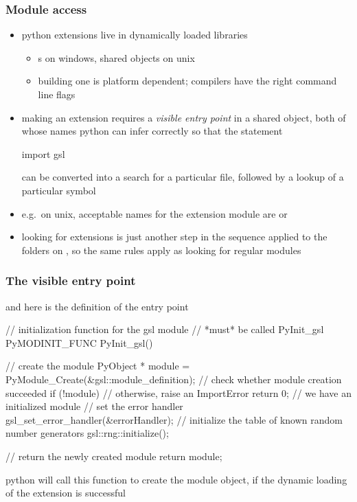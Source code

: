 \begin{frame}[fragile]
%
  \frametitle{Module access}
%
  \begin{itemize}
  \item python extensions live in dynamically loaded libraries
  \begin{itemize}
  \item {}s on windows, shared objects on unix
  \item building one is platform dependent; compilers have the right command line flags
  \end{itemize}
%
  \item making an extension requires a \emph{visible entry point} in a shared object, both of whose
    names python can infer correctly so that the statement
    \begin{ipython}{}
    import gsl
    \end{ipython}
    can be converted into a search for a particular file, followed by a lookup of a particular
    symbol
%
  \item e.g.~on unix, acceptable names for the  extension module are
     or 
%
  \item looking for extensions is just another step in the sequence applied to the folders on
    , so the same rules apply as looking for regular modules
%
  \end{itemize}
%
\end{frame}

\begin{frame}[fragile]
%
  \frametitle{The visible entry point}
%
  and here is the definition of the entry point
%
  \begin{iC++}{}
// initialization function for the gsl module
// *must* be called PyInit_gsl
PyMODINIT_FUNC PyInit_gsl()
{
    // create the module
    PyObject * module = PyModule_Create(&gsl::module_definition);
    // check whether module creation succeeded
    if (!module) { 
        // otherwise, raise an ImportError
        return 0; 
    }
    // we have an initialized module
    // set the error handler
    gsl_set_error_handler(&errorHandler);
    // initialize the table of known random number generators
    gsl::rng::initialize();

    // return the newly created module
    return module;
}
  \end{iC++}
%
 python will call this function to create the module object, if the dynamic loading of the
 extension is successful
%
\end{frame}

